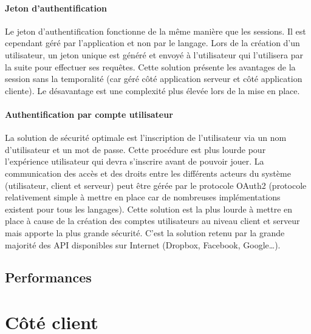 
		\paragraph{Jeton d'authentification} %
		\label{par:jeton_d_authentification}
		
			Le jeton d'authentification fonctionne de la même manière que les sessions. Il est cependant géré par l'application et non par le langage. Lors de la création d'un utilisateur, un jeton unique est généré et envoyé à l'utilisateur qui l'utilisera par la suite pour effectuer ses requêtes. Cette solution présente les avantages de la session sans la temporalité (car géré côté application serveur et côté application cliente). Le désavantage est une complexité plus élevée lors de la mise en place.


		\paragraph{Authentification par compte utilisateur} %
		\label{par:authentification_par_compte_utilisateur}
		
			La solution de sécurité optimale est l'inscription de l'utilisateur via un nom d'utilisateur et un mot de passe. Cette procédure est plus lourde pour l'expérience utilisateur qui devra s'inscrire avant de pouvoir jouer. La communication des accès et des droits entre les différents acteurs du système (utilisateur, client et serveur) peut être gérée par le protocole OAuth2 (protocole relativement simple à mettre en place car de nombreuses implémentations existent pour tous les langages). Cette solution est la plus lourde à mettre en place à cause de la création des comptes utilisateurs au niveau client et serveur mais apporte la plus grande sécurité. C'est la solution retenu par la grande majorité des API disponibles sur Internet (Dropbox, Facebook, Google\dots).



	\subsection{Performances} %
	\label{sub:performances}


\section{Côté client}
